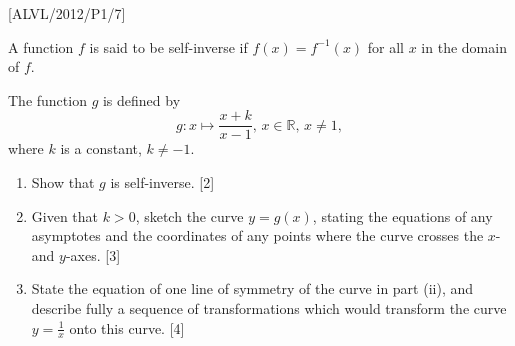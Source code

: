 \item {[}ALVL/2012/P1/7{]}

A function $f$ is said to be self-inverse if $f\left(x\right)=f^{-1}\left(x\right)$
for all $x$ in the domain of $f$. 

The function $g$ is defined by 
\[
g:x\mapsto\frac{x+k}{x-1},\,x\in\mathbb{R},\,x\ne1,
\]
 where $k$ is a constant, $k\neq-1$.
\begin{enumerate}
\item Show that $g$ is self-inverse. \hfill{} {[}2{]}
\item Given that $k>0$, sketch the curve $y=g\left(x\right)$, stating
the equations of any asymptotes and the coordinates of any points
where the curve crosses the $x$- and $y$-axes. \hfill{} {[}3{]}
\item State the equation of one line of symmetry of the curve in part (ii),
and describe fully a sequence of transformations which would transform
the curve $y=\frac{1}{x}$ onto this curve. \hfill{}{[}4{]}
\end{enumerate}
